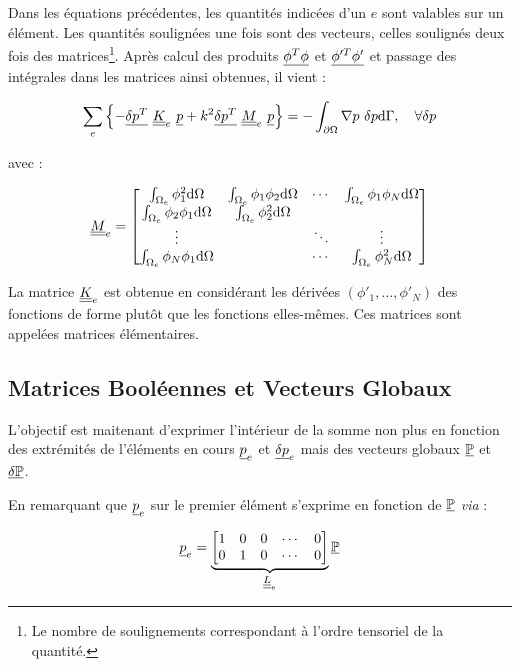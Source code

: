 Dans les équations précédentes, les quantités indicées d'un $e$ sont valables sur un élément. Les quantités soulignées
une fois sont des vecteurs, celles soulignés deux fois des matrices\footnote{Le nombre de soulignements correspondant à
l'ordre tensoriel de la quantité.}.
Après calcul des produits $\underline{\phi^T\phi}$ et $\underline{\phi'^T\phi'}$ et passage des intégrales dans les matrices ainsi
obtenues, il vient :

\begin{equation}
	\sum_e\left\{- \underline{\delta p^T}~\underline{\underline{K}}_e~\underline{p} + k^2 \underline{\delta p^T}~\underline{\underline{M}}_e~\underline{p} \right\} = -\int_{\partial\Omega}\nabla p~\delta p\mathrm{d}\Gamma, \quad \forall\delta p\label{FEM1D:elem_mat}\\
\end{equation}

avec :

\begin{equation*}
	\underline{\underline{M}}_e = \begin{bmatrix}
		\int_{\Omega_e}\phi_1^2\mathrm{d}\Omega & \int_{\Omega_e}\phi_1\phi_2\mathrm{d}\Omega & \cdots  &\int_{\Omega_e}\phi_1\phi_N\mathrm{d}\Omega\\
		\int_{\Omega_e}\phi_2\phi_1\mathrm{d}\Omega & \int_{\Omega_e}\phi_2^2\mathrm{d}\Omega & &\\
		\vdots & & \ddots & \vdots\\
		\int_{\Omega_e}\phi_N\phi_1\mathrm{d}\Omega & & \cdots & \int_{\Omega_e}\phi_N^2\mathrm{d}\Omega
	\end{bmatrix}
\end{equation*}

La matrice $\underline{\underline{K}}_e$ est obtenue en considérant les dérivées $(\phi'_1,\ldots,\phi'_N)$ des fonctions de forme plutôt que les
fonctions elles-mêmes. Ces matrices sont appelées matrices élémentaires.

\subsection{Matrices Booléennes et Vecteurs Globaux}
\newcommand{\GP}{\ul{\mathbb{P}}}
\newcommand{\GDP}{\ul{\delta\mathbb{P}}}
L'objectif est maitenant d'exprimer l'intérieur de la somme non plus en fonction des extrémités de l'éléments en cours
$\underline{p}_e$ et $\underline{\delta p}_e$ mais des vecteurs globaux $\GP$ et $\GDP$.

En remarquant que $\underline{p}_e$ sur le premier élément s'exprime en fonction de $\GP$ \textit{via} :

\begin{equation*}
    \ul{p}_e =
    \underbrace{\begin{bmatrix}
         1 & 0 & 0 & \cdots & 0\\
         0 & 1 & 0 & \cdots & 0
    \end{bmatrix}}_{\uul{L}_e}\GP
\end{equation*}

